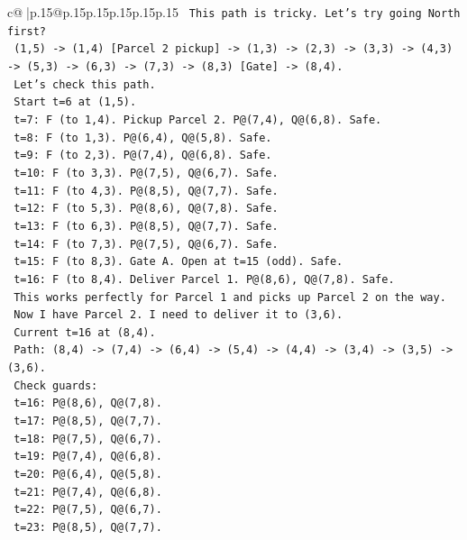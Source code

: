 \documentclass{article}
\begin{document}
{\begin{supertabular}{c@{$\;$}|p{.15\linewidth}@{}p{.15\linewidth}p{.15\linewidth}p{.15\linewidth}p{.15\linewidth}p{.15\linewidth}}
{{{\texttt{    This path is tricky. Let's try going North first?} \\
\texttt{    (1,5) {-}> (1,4) {[}Parcel 2 pickup{]} {-}> (1,3) {-}> (2,3) {-}> (3,3) {-}> (4,3) {-}> (5,3) {-}> (6,3) {-}> (7,3) {-}> (8,3) {[}Gate{]} {-}> (8,4).} \\
\texttt{    Let's check this path.} \\
\texttt{    Start t=6 at (1,5).} \\
\texttt{    t=7: F (to 1,4). Pickup Parcel 2. P@(7,4), Q@(6,8). Safe.} \\
\texttt{    t=8: F (to 1,3). P@(6,4), Q@(5,8). Safe.} \\
\texttt{    t=9: F (to 2,3). P@(7,4), Q@(6,8). Safe.} \\
\texttt{    t=10: F (to 3,3). P@(7,5), Q@(6,7). Safe.} \\
\texttt{    t=11: F (to 4,3). P@(8,5), Q@(7,7). Safe.} \\
\texttt{    t=12: F (to 5,3). P@(8,6), Q@(7,8). Safe.} \\
\texttt{    t=13: F (to 6,3). P@(8,5), Q@(7,7). Safe.} \\
\texttt{    t=14: F (to 7,3). P@(7,5), Q@(6,7). Safe.} \\
\texttt{    t=15: F (to 8,3). Gate A. Open at t=15 (odd). Safe.} \\
\texttt{    t=16: F (to 8,4). Deliver Parcel 1. P@(8,6), Q@(7,8). Safe.} \\
\texttt{    This works perfectly for Parcel 1 and picks up Parcel 2 on the way.} \\
\texttt{    Now I have Parcel 2. I need to deliver it to (3,6).} \\
\texttt{    Current t=16 at (8,4).} \\
\texttt{    Path: (8,4) {-}> (7,4) {-}> (6,4) {-}> (5,4) {-}> (4,4) {-}> (3,4) {-}> (3,5) {-}> (3,6).} \\
\texttt{    Check guards:} \\
\texttt{    t=16: P@(8,6), Q@(7,8).} \\
\texttt{    t=17: P@(8,5), Q@(7,7).} \\
\texttt{    t=18: P@(7,5), Q@(6,7).} \\
\texttt{    t=19: P@(7,4), Q@(6,8).} \\
\texttt{    t=20: P@(6,4), Q@(5,8).} \\
\texttt{    t=21: P@(7,4), Q@(6,8).} \\
\texttt{    t=22: P@(7,5), Q@(6,7).} \\
\texttt{    t=23: P@(8,5), Q@(7,7).} \\
}}}
\end{supertabular}}
\end{document}
